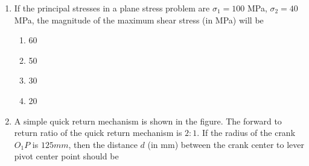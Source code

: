 \documentclass[journal]{IEEEtran}
\begin{document}
\begin{enumerate}
    \begin{center}
    \end{center}

    \begin{multicols}{4}
    \begin{enumerate}
        \item 176.2
        \item 196.0
        \item 481.0
        \item 981.0
    \end{enumerate}
    \end{multicols}

    \item If the principal stresses in a plane stress problem are $\sigma_1 = 100$ MPa,
    $\sigma_2 = 40$ MPa, the magnitude of the maximum shear stress (in MPa) will be
    \begin{multicols}{4}
    \begin{enumerate}
        \item 60
        \item 50
        \item 30
        \item 20
    \end{enumerate}
    \end{multicols}

    \item A simple quick return mechanism is shown in the figure. The forward to return
    ratio of the quick return mechanism is $2:1$. If the radius of the crank $O_1P$ is
    $125 mm$, then the distance $d$ (in mm) between the crank center to lever pivot center
    point should be

    \begin{center}    
\end{center}
\end{enumerate}
\end{document}

